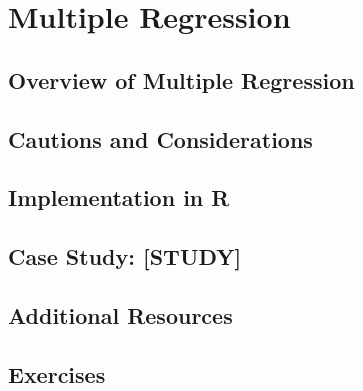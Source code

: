 
\chapter{Multiple Regression}

\section{Overview of Multiple Regression}

\section{Cautions and Considerations}

\section{Implementation in R}

\section{Case Study: [STUDY]}

\section{Additional Resources}

\section{Exercises}
